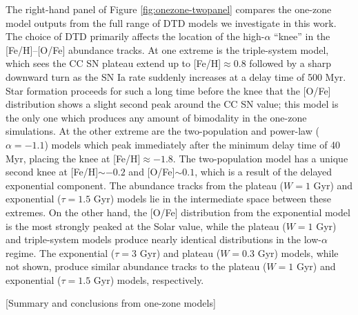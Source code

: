 \documentclass[twocolumn,twocolappendix,linenumbers,trackchanges]{aastex631}
\begin{document}
The right-hand panel of Figure \ref{fig:onezone-twopanel} compares the one-zone model outputs from the full range of DTD models we investigate in this work. The choice of DTD primarily affects the location of the high-$\alpha$ ``knee'' in the [Fe/H]--[O/Fe] abundance tracks. At one extreme is the triple-system model, which sees the CC SN plateau extend up to [Fe/H]$\approx0.8$ followed by a sharp downward turn as the SN Ia rate suddenly increases at a delay time of 500 Myr. Star formation proceeds for such a long time before the knee that the [O/Fe] distribution shows a slight second peak around the CC SN value; this model is the only one which produces any amount of bimodality in the one-zone simulations. At the other extreme are the two-population and power-law ($\alpha=-1.1$) models which peak immediately after the minimum delay time of 40 Myr, placing the knee at [Fe/H]$\approx-1.8$. The two-population model has a unique second knee at [Fe/H]$\sim-0.2$ and [O/Fe]$\sim0.1$, which is a result of the delayed exponential component. The abundance tracks from the plateau ($W=1$ Gyr) and exponential ($\tau=1.5$ Gyr) models lie in the intermediate space between these extremes. On the other hand, the [O/Fe] distribution from the exponential model is the most strongly peaked at the Solar value, while the plateau ($W=1$ Gyr) and triple-system models produce nearly identical distributions in the low-$\alpha$ regime. The exponential ($\tau=3$ Gyr) and plateau ($W=0.3$ Gyr) models, while not shown, produce similar abundance tracks to the plateau ($W=1$ Gyr) and exponential ($\tau=1.5$ Gyr) models, respectively.

[Summary and conclusions from one-zone models]


\end{document}
